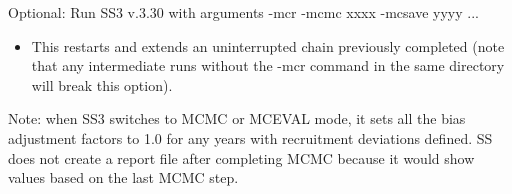 \noindent Optional: Run SS3 v.3.30 with arguments -mcr -mcmc xxxx -mcsave yyyy ...
\begin{itemize}
	\item This restarts and extends an uninterrupted chain previously completed (note that any intermediate runs without the -mcr command in the same directory will break this option).
\end{itemize}

Note: when SS3 switches to MCMC or MCEVAL mode, it sets all the bias adjustment factors to 1.0 for any years with recruitment deviations defined.  SS does not create a report file after completing MCMC because it would show values based on the last MCMC step.

\pagebreak
